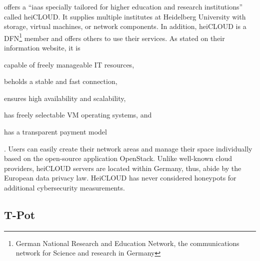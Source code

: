 \citet{urz2021} offers a \enquote{\ac{iaas} specially tailored for higher education and research institutions} called heiCLOUD.
It supplies multiple institutes at Heidelberg University with storage, virtual machines, or network components.
In addition, heiCLOUD is a DFN\footnote{German National Research and Education Network, the communications network for Science and research in Germany} member and offers others to use their services.
As stated on their information website\cite{heicloud2021}, it is
\begin{enumerate*}[label=(\roman*)]
    \item capable of freely manageable IT resources,
    \item beholds a stable and fast connection,
    \item ensures high availability and scalability,
    \item has freely selectable VM operating systems, and
    \item has a transparent payment model
\end{enumerate*} \cite{heicloud2021}.
Users can easily create their network areas and manage their space individually based on the open-source application OpenStack.
Unlike well-known cloud providers, heiCLOUD servers are located within Germany, thus, abide by the European data privacy law.
HeiCLOUD has never considered honeypots for additional cybersecurity measurements.

\subsection{T-Pot}
\label{subsec:tpot}

